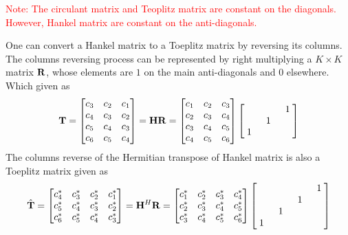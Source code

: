 \documentclass[revised,endfloat]{geophysics}
\begin{document}
\textcolor{red}{Note: The circulant matrix and Teoplitz matrix are constant on the diagonals. However, Hankel matrix are constant on the anti-diagonals.}

One can convert a Hankel matrix to a Toeplitz matrix by reversing its columns. The columns reversing process can be represented by right multiplying a $K \times K$ matrix ${\bf R}$, whose elements are $1$ on the main anti-diagonals and 0 elsewhere. Which given as
\begin{equation}
{\bf T}= \begin{bmatrix}
c_3 & c_2 & c_1 \\ 
c_4 & c_3 & c_2 \\ 
c_5 & c_4 & c_3 \\ 
c_6 & c_5 & c_4 \\ 
\end{bmatrix} = {\bf HR} = 
\begin{bmatrix}
c_1 & c_2 & c_3  \\ 
c_2 & c_3 & c_4  \\ 
c_3 & c_4 & c_5  \\ 
c_4 & c_5 & c_6  \\ 
\end{bmatrix}
\begin{bmatrix}
\quad &  \quad & 1 \\
\quad &  1 & \quad \\
1 &  \quad & \quad \\
\end{bmatrix}
\end{equation}
The columns reverse of the Hermitian transpose of Hankel matrix is also a Toeplitz matrix given as 
\begin{equation}
\hat{\bf T}= \begin{bmatrix}
c_4^* & c_3^* & c_2^* & c_1^* \\ 
c_5^* & c_4^* & c_3^* & c_2^* \\ 
c_6^* & c_5^* & c_4^* & c_3^* \\ 
\end{bmatrix} = {\bf H}^H{\bf R} = 
\begin{bmatrix}
c_1^*  & c_2^*  & c_3^*  & c_4^*  \\ 
c_2^*  & c_3^*  & c_4^*  & c_5^*  \\ 
c_3^*  & c_4^*  & c_5^*  & c_6^*  \\ 
\end{bmatrix}
\begin{bmatrix}
\quad & \quad &  \quad & 1 \\
\quad & \quad &  1 & \quad \\
\quad & 1        &  \quad & \quad \\
1        & \quad &  \quad & \quad \\
\end{bmatrix}
\end{equation}
\end{document}
